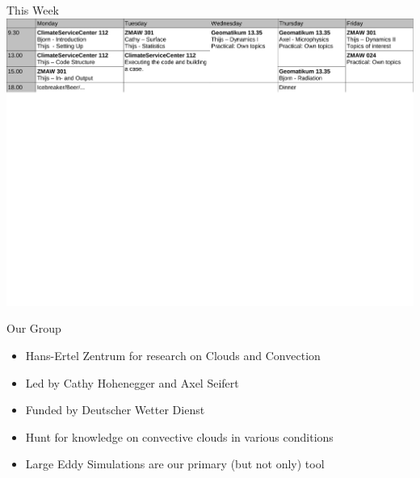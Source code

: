 \author{Thijs Heus}
\begin{frame}{This Week}
\includegraphics[width=\textwidth]{schedule.pdf}
\end{frame}
\begin{frame}{Our Group}
 \begin{itemize}
  \item Hans-Ertel Zentrum for research on Clouds and Convection
  \item Led by Cathy Hohenegger and Axel Seifert
  \item Funded by Deutscher Wetter Dienst
  \item Hunt for knowledge on convective clouds in various conditions
  \item Large Eddy Simulations are our primary (but not only) tool
 \end{itemize}

\end{frame}


